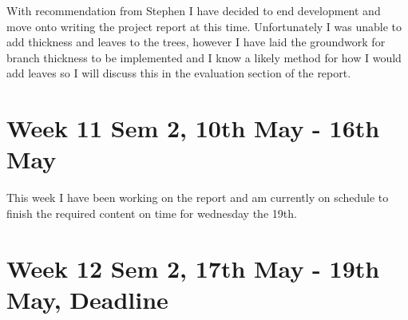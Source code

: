 \documentclass[11pt]{article}
\begin{document}
With recommendation from Stephen I have decided to end development and move onto writing the 
project report at this time. Unfortunately I was unable to add thickness and leaves to the 
trees, however I have laid the groundwork for branch thickness to be implemented and I know 
a likely method for how I would add leaves so I will discuss this in the evaluation section of 
the report.

\section*{Week 11 Sem 2, 10th May - 16th May}
This week I have been working on the report and am currently on schedule to finish the required 
content on time for wednesday the 19th.

\section*{Week 12 Sem 2, 17th May - 19th May, Deadline}
\end{document}

